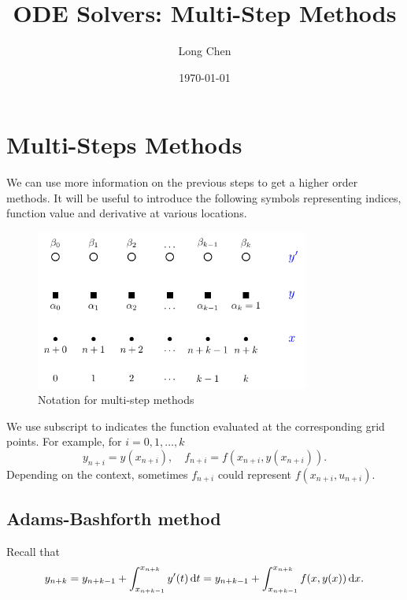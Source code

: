 \documentclass[10pt]{amsart}
\begin{document}
\title{ODE Solvers: Multi-Step Methods}
\author{Long Chen}\date{\today}
\begin{abstract}

\end{abstract}
\maketitle

\tableofcontents

\section{Multi-Steps Methods}
We can use more information on the previous steps to get a higher order methods. It will be useful to introduce the following symbols representing indices, function value and derivative at various locations.

\begin{figure}[htbp]
\begin{center}
\includegraphics[width=9cm]{figures/multistep.pdf}
\caption{Notation for multi-step methods}
\label{fig:multistep}
\end{center}
\end{figure}

We use subscript to indicates the function evaluated at the corresponding grid points. For example, for $i=0,1,\ldots, k$
$$
y_{n+i} = y(x_{n+i}), \quad f_{n+i} = f(x_{n+i}, y(x_{n+i})).
$$
Depending on the context, sometimes $f_{n+i}$ could represent $f(x_{n+i}, u_{n+i})$.

\subsection{Adams-Bashforth method}
Recall that 
\begin{equation}
y_{n+k} = y_{n+k-1} + \int_{x_{n+k-1}}^{x_{n+k}} y'(t)\,{\rm d} t = y_{n+k-1} + \int_{x_{n+k-1}}^{x_{n+k}} f(x, y(x))\,{\rm d}x.
\end{equation}
\end{document}
